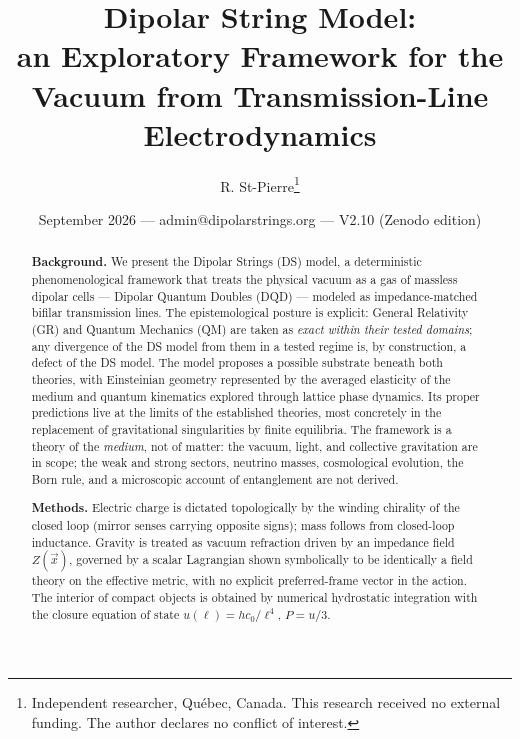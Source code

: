 \documentclass[11pt,a4paper]{article}
\title{\textbf{Dipolar String Model:}\\ \large an Exploratory Framework for the Vacuum from Transmission-Line Electrodynamics}
\author{R. St-Pierre\thanks{Independent researcher, Qu\'ebec, Canada. This research received no external funding. The author declares no conflict of interest.}}
\date{September 2026 --- admin@dipolarstrings.org --- V2.10 (Zenodo edition)}
\theoremstyle{plain}
\theoremstyle{remark}
\begin{document}
\maketitle

\begin{abstract}
\noindent\textbf{Background.} We present the Dipolar Strings (DS) model, a deterministic phenomenological framework that treats the physical vacuum as a gas of massless dipolar cells --- Dipolar Quantum Doubles (DQD) --- modeled as impedance-matched bifilar transmission lines. The epistemological posture is explicit: General Relativity (GR) and Quantum Mechanics (QM) are taken as \emph{exact within their tested domains}; any divergence of the DS model from them in a tested regime is, by construction, a defect of the DS model. The model proposes a possible substrate beneath both theories, with Einsteinian geometry represented by the averaged elasticity of the medium and quantum kinematics explored through lattice phase dynamics. Its proper predictions live at the limits of the established theories, most concretely in the replacement of gravitational singularities by finite equilibria. The framework is a theory of the \emph{medium}, not of matter: the vacuum, light, and collective gravitation are in scope; the weak and strong sectors, neutrino masses, cosmological evolution, the Born rule, and a microscopic account of entanglement are not derived.

\noindent\textbf{Methods.} Electric charge is dictated topologically by the winding chirality of the closed loop (mirror senses carrying opposite signs); mass follows from closed-loop inductance. Gravity is treated as vacuum refraction driven by an impedance field $Z(\vec{x})$, governed by a scalar Lagrangian shown symbolically to be identically a field theory on the effective metric, with no explicit preferred-frame vector in the action. The interior of compact objects is obtained by numerical hydrostatic integration with the closure equation of state $u(\ell) = hc_0/\ell^4$, $P = u/3$.


\end{abstract}
\end{document}
